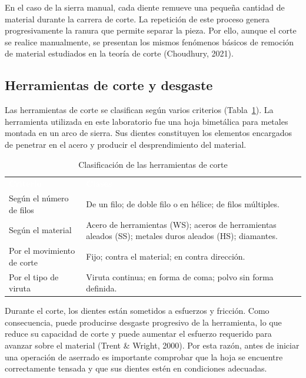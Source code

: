 \documentclass[12pt,a4paper]{article}
\newcommand{\encab}[1]{\textcolor{white}{\sffamily\bfseries #1}}
\begin{document}
\vspace{2pt}

En el caso de la sierra manual, cada diente remueve una pequeña cantidad de
material durante la carrera de corte. La repetición de este proceso genera
progresivamente la ranura que permite separar la pieza. Por ello, aunque el
corte se realice manualmente, se presentan los mismos fenómenos básicos de
remoción de material estudiados en la teoría de corte (Choudhury, 2021).

\subsection{Herramientas de corte y desgaste}

Las herramientas de corte se clasifican según varios criterios
(Tabla~\ref{tab:clasif}). La herramienta utilizada en este laboratorio fue una
hoja bimetálica para metales montada en un arco de sierra. Sus dientes
constituyen los elementos encargados de penetrar en el acero y producir el
desprendimiento del material.

\vspace{6pt}

\begin{table}[!htb]
	\centering
	\caption{Clasificación de las herramientas de corte}\label{tab:clasif}
	\small
	\begin{tabularx}{\linewidth}{>{\raggedright\arraybackslash}p{4.3cm} X}
		\rowcolor{darkblue}
		\encab{Criterio}           & \encab{Clases}
		\\
		Según el número de filos   & De un filo; de doble filo o en hélice; de filos
		múltiples.
		\\
		Según el material          & Acero de herramientas (WS); aceros de
		herramientas aleados (SS);
		metales duros aleados (HS); diamantes.
		\\
		Por el movimiento de corte & Fijo; contra el material; en contra dirección.
		\\
		Por el tipo de viruta      & Viruta continua; en forma de coma; polvo sin
		forma definida.
		\\
	\end{tabularx}
\end{table}

\vspace{2pt}

Durante el corte, los dientes están sometidos a esfuerzos y fricción. Como
consecuencia, puede producirse desgaste progresivo de la herramienta, lo que
reduce su capacidad de corte y puede aumentar el esfuerzo requerido para avanzar
sobre el material (Trent \& Wright, 2000). Por esta razón, antes de iniciar una
operación de aserrado es importante
comprobar que la hoja se encuentre correctamente tensada y que sus dientes estén
en condiciones adecuadas.
\end{document}
